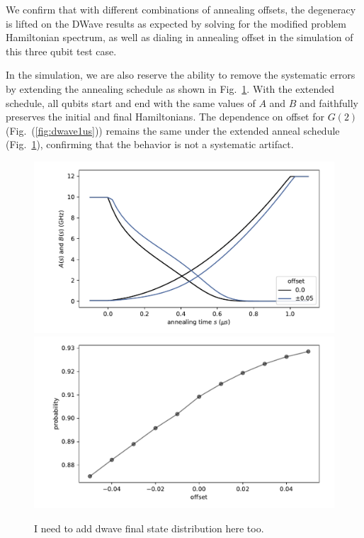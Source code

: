 \documentclass[prd,twocolumn,tightenlines,preprintnumbers,showpacs,superscriptaddress,notitlepage,nofootinbib,eqsecnum,floatfix,longbibliography,aps,10pt]{revtex4-2}
\begin{document}
We confirm that with different combinations of annealing offsets, the degeneracy is lifted on the DWave results as expected by solving for the modified problem Hamiltonian spectrum, as well as dialing in annealing offset in the simulation of this three qubit test case.

In the simulation, we are also reserve the ability to remove the systematic errors by extending the annealing schedule as shown in Fig.~\ref{fig:anneal_schedule_ext}. With the extended schedule, all qubits start and end with the same values of $A$ and $B$ and faithfully preserves the initial and final Hamiltonians. The dependence on offset for $G(2)$ (Fig.~(\ref{fig:dwave1us})) remains the same under the extended anneal schedule (Fig.~\ref{fig:anneal_schedule_ext}), confirming that the behavior is not a systematic artifact.

\begin{figure}
	\centering
	\includegraphics[width=\columnwidth]{./new_figures/anneal_schedule_extended.pdf}
	\includegraphics[width=\columnwidth]{./new_figures/NN2_offset_scaling_extended.pdf}
	\caption{{\color{red}I need to add dwave final state distribution here too.}}
	\label{fig:anneal_schedule_ext}
\end{figure}
\end{document}

